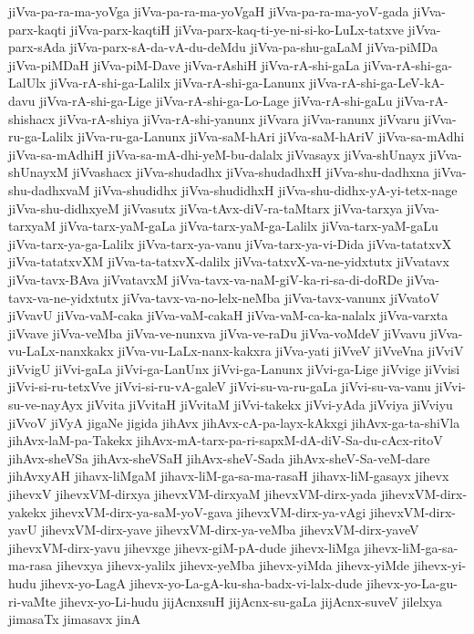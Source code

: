 {jiVva-pa-ra-ma-yoVga
jiVva-pa-ra-ma-yoVgaH
jiVva-pa-ra-ma-yoV-gada
jiVva-parx-kaqti
jiVva-parx-kaqtiH
jiVva-parx-kaq-ti-ye-ni-si-ko-LuLx-tatxve
jiVva-parx-sAda
jiVva-parx-sA-da-vA-du-deMdu
jiVva-pa-shu-gaLaM
jiVva-piMDa
jiVva-piMDaH
jiVva-piM-Dave
jiVva-rAshiH
jiVva-rA-shi-gaLa
jiVva-rA-shi-ga-LalUlx
jiVva-rA-shi-ga-Lalilx
jiVva-rA-shi-ga-Lanunx
jiVva-rA-shi-ga-LeV-kA-davu
jiVva-rA-shi-ga-Lige
jiVva-rA-shi-ga-Lo-Lage
jiVva-rA-shi-gaLu
jiVva-rA-shishacx
jiVva-rA-shiya
jiVva-rA-shi-yanunx
jiVvara
jiVva-ranunx
jiVvaru
jiVva-ru-ga-Lalilx
jiVva-ru-ga-Lanunx
jiVva-saM-hAri
jiVva-saM-hAriV
jiVva-sa-mAdhi
jiVva-sa-mAdhiH
jiVva-sa-mA-dhi-yeM-bu-dalalx
jiVvasayx
jiVva-shUnayx
jiVva-shUnayxM
jiVvashacx
jiVva-shudadhx
jiVva-shudadhxH
jiVva-shu-dadhxna
jiVva-shu-dadhxvaM
jiVva-shudidhx
jiVva-shudidhxH
jiVva-shu-didhx-yA-yi-tetx-nage
jiVva-shu-didhxyeM
jiVvasutx
jiVva-tAvx-diV-ra-taMtarx
jiVva-tarxya
jiVva-tarxyaM
jiVva-tarx-yaM-gaLa
jiVva-tarx-yaM-ga-Lalilx
jiVva-tarx-yaM-gaLu
jiVva-tarx-ya-ga-Lalilx
jiVva-tarx-ya-vanu
jiVva-tarx-ya-vi-Dida
jiVva-tatatxvX
jiVva-tatatxvXM
jiVva-ta-tatxvX-dalilx
jiVva-tatxvX-va-ne-yidxtutx
jiVvatavx
jiVva-tavx-BAva
jiVvatavxM
jiVva-tavx-va-naM-giV-ka-ri-sa-di-doRDe
jiVva-tavx-va-ne-yidxtutx
jiVva-tavx-va-no-lelx-neMba
jiVva-tavx-vanunx
jiVvatoV
jiVvavU
jiVva-vaM-caka
jiVva-vaM-cakaH
jiVva-vaM-ca-ka-nalalx
jiVva-varxta
jiVvave
jiVva-veMba
jiVva-ve-nunxva
jiVva-ve-raDu
jiVva-voMdeV
jiVvavu
jiVva-vu-LaLx-nanxkakx
jiVva-vu-LaLx-nanx-kakxra
jiVva-yati
jiVveV
jiVveVna
jiVviV
jiVvigU
jiVvi-gaLa
jiVvi-ga-LanUnx
jiVvi-ga-Lanunx
jiVvi-ga-Lige
jiVvige
jiVvisi
jiVvi-si-ru-tetxVve
jiVvi-si-ru-vA-galeV
jiVvi-su-va-ru-gaLa
jiVvi-su-va-vanu
jiVvi-su-ve-nayAyx
jiVvita
jiVvitaH
jiVvitaM
jiVvi-takekx
jiVvi-yAda
jiVviya
jiVviyu
jiVvoV
jiVyA
jigaNe
jigida
jihAvx
jihAvx-cA-pa-layx-kAkxgi
jihAvx-ga-ta-shiVla
jihAvx-laM-pa-Takekx
jihAvx-mA-tarx-pa-ri-sapxM-dA-diV-Sa-du-cAcx-ritoV
jihAvx-sheVSa
jihAvx-sheVSaH
jihAvx-sheV-Sada
jihAvx-sheV-Sa-veM-dare
jihAvxyAH
jihavx-liMgaM
jihavx-liM-ga-sa-ma-rasaH
jihavx-liM-gasayx
jihevx
jihevxV
jihevxVM-dirxya
jihevxVM-dirxyaM
jihevxVM-dirx-yada
jihevxVM-dirx-yakekx
jihevxVM-dirx-ya-saM-yoV-gava
jihevxVM-dirx-ya-vAgi
jihevxVM-dirx-yavU
jihevxVM-dirx-yave
jihevxVM-dirx-ya-veMba
jihevxVM-dirx-yaveV
jihevxVM-dirx-yavu
jihevxge
jihevx-giM-pA-dude
jihevx-liMga
jihevx-liM-ga-sa-ma-rasa
jihevxya
jihevx-yalilx
jihevx-yeMba
jihevx-yiMda
jihevx-yiMde
jihevx-yi-hudu
jihevx-yo-LagA
jihevx-yo-La-gA-ku-sha-badx-vi-lalx-dude
jihevx-yo-La-gu-ri-vaMte
jihevx-yo-Li-hudu
jijAcnxsuH
jijAcnx-su-gaLa
jijAcnx-suveV
jilelxya
jimasaTx
jimasavx
jinA
}
